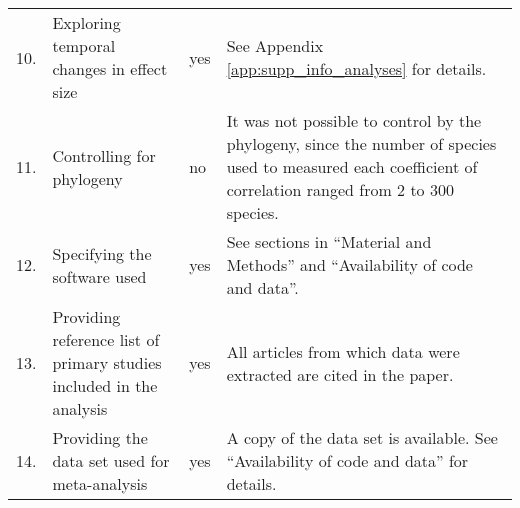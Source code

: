 \documentclass[a4paper,11pt]{article}
\begin{document}
\begin{table}[h!]
{\begin{tabular}{p{0.2cm}p{4cm}p{0.8cm}p{7cm}}
  10.& Exploring temporal changes in effect size &  yes & See Appendix \ref{app:supp_info_analyses} for details.\\
  11.& Controlling for phylogeny &  no &  It was not possible to control by the phylogeny, since the number of species used to measured each coefficient of correlation ranged from 2 to 300 species.\\
  12.& Specifying the software used & yes & See sections in ``Material and Methods'' and ``Availability of code and data''.\\
 13.& Providing reference list of primary studies included in the analysis &  yes & All articles from which data were extracted are cited in the paper.\\
  14.& Providing the data set used for meta-analysis  & yes & A copy of the data set is available. See ``Availability of code and data'' for details.\\
   \hline
\end{tabular}
}
\label{tab:meta}
\end{table}
\end{document}
